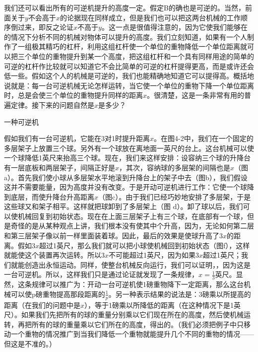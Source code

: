 \documentclass[12pt,oneside]{book}
\begin{document}
\begin{common-format}
我们还可以看出所有的可逆机提升的高度一定。假定B的确也是可逆的。当然，前面关于$ y $不会高于$ x $的论据现在同样成立，但是我们也可以把这两台机械的工作顺序倒过来，即反之论证$ x $不高于$ y $。这一点是很值得注意的，因为它使我们能够在的情况下分析不同的机械对物体可以提升的高度。我们立刻知道，如果有一个人制作了一组极其精巧的杠杆，利用这组杠杆使一个单位的重物降低一个单位距离就可以把三个单位的重物提升到某一个高度，把这组杠杆和一个具有同样用途的简单的可逆的杠杆作比较就可以知道它不会比简单的可逆的杠杆提得更高，而是或许还会低一些。假如这个人的机械是可逆的，我们也能精确地知道它可以提得高。概括地说就是：每一台可逆机械无论怎样运转，当它使一个单位的重物下降一个单位距离时，总是会使三个单位的重物提升同样的距离$ x $。很清楚，这是一条非常有用的普遍定律。接下来的问题自然是$ x $是多少？
\begin{fig}{一种可逆机}
\caption{一种可逆机}
\label{fig:一种可逆机}
\end{fig}
假如我们有一台可逆机，它能在3对1时提升距离$ x $。在图4-2中，我们在一个固定的多层架子上放置三个球。另外有一个球放在离地面一英尺的台上。这台机械可以使一个球降低1英尺来抬高三个球。现在，我们来这样安排：设容纳三个球的升降台有一层底板和两层架子，间隔正好是$ x $，其次，容纳球的多层架的间隔也是$ x $（图a）。首先我们使小球从多层架水平地滚到升降台上的架子中去（图b），我们假设这并不需要能量，因为高度并没有改变。于是开动可逆机进行工作：它使一个球降到底层，而使升降台升高距离$ x $（图c）。由于我们已经巧妙地安排了多层架，于是这些球又和架子相平。这样就把球卸到了多层架上（图 d）。卸了球以后，我们可以使机械回复到初始状态。现在在上面三层架子上有三个球，在底部有一个球，但是奇怪的是从某种观点上讲，我们根本没有使其中个升高，因为，无论如何第二层和第三层架子像以前一样里面装着球。因此，最后的效果是使球升高了$ 3x$的距离。假如$  3x $超过1英尺，那么我们就可以把小球使机械回到初始状态（图f），这样就能使这个装置再次运转。所以$ 3x $不可能超过1英尺，因为如果$ 3x $超过1英尺；我们就能创造出永恒运动。同样，使整台机械反向运行，我们可以证明，，因为这是一台可逆机。所以，这样我们只是通过论证就发现了一条规律，$ x=\frac{1}{3} $英尺。显然，这条规律可以推广为：开动一台可逆机使1磅重物降下一定距离，那么这台机械可以使p磅重物提高那段距离的$ \frac{1}{p} $。另一种表示结果的说法是：3磅乘以所提高的距离（在我们的问题中是$ x $），等于1磅乘以所降低的距离（在这种情况下是1英尺）。如果我们先把所有的球的重量分别乘以它们现在所在的高度，然后使机械运转，再把所有的球的重量乘以它们所在的高度，得出的。（我们必须把例子中只移动一个重物的情况推广到当我们降低一个重物就能提升几个不同的重物的情况——但这是不准的。）


\end{common-format}
\end{document}
